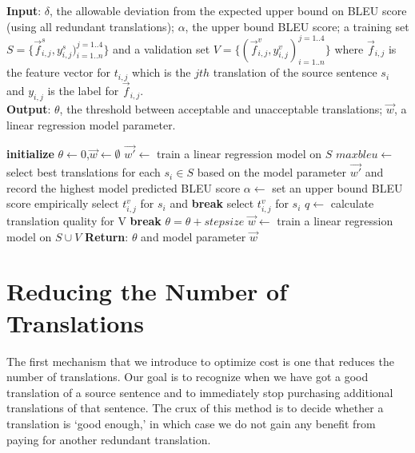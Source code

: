 \documentclass[11pt,letterpaper]{article}
\begin{document}
\begin{algorithm}[h!]
\caption{}\label{modelselection}
\textbf{Input}: $\delta$, the allowable deviation from the expected upper bound on BLEU score (using all redundant translations); $\alpha$, the upper bound BLEU score; a training set $S = \{\vec f^{s}_{i,j},y^{s}_{i,j})_{i=1..n}^{j=1..4}\}$ and a validation set $V = \{(\vec f^{v}_{i,j},y^{v}_{i,j})_{i=1..n}^{j=1..4}\}$ where $\vec f_{i,j}$ is the feature vector for $t_{i,j}$ which is the $jth$ translation of the source sentence $s_{i}$ and $y_{i,j}$ is the label for $\vec f_{i,j}$.\\
\textbf{Output}: $\theta$, the threshold between acceptable and unacceptable translations; $\vec{w}$, a linear regression model parameter. 
\begin{algorithmic}[1]
\State \textbf{initialize} $\theta \leftarrow 0$,$\vec{w}\leftarrow \emptyset$ 
\State $\vec{w'}\leftarrow$ train a linear regression model on $S$
\State $maxbleu \leftarrow$ select best translations for each $s_i \in S$ based on the model parameter $\vec{w'}$ and record the highest model predicted BLEU score
\State $\alpha \leftarrow$ set an upper bound BLEU score empirically
             select $t^{v}_{i,j}$ for $s_i$ and \textbf{break}
\EndIf
{} select $t^{v}_{i,j}$ for $s_i$
\EndIf
\EndFor
\EndFor
\State $q \leftarrow$ calculate translation quality for V
 \textbf{break}
\Else \text{  } $\theta = \theta + stepsize$
\EndIf
\EndWhile
\State $\vec {w} \leftarrow$ train a linear regression model on $S \cup V$
\State \textbf{Return}: $\theta$ and model parameter $\vec{w}$
\end{algorithmic}
\end{algorithm}



\section{Reducing the Number of Translations}
The first mechanism that we introduce to optimize cost is one that reduces the number of translations.  Our goal is to recognize when we have got a good translation of a source sentence and to immediately stop purchasing additional  translations of that sentence.  The crux of this method is to decide whether a translation  is `good enough,' in which case we do not gain any benefit from  paying for another redundant translation.  
\end{document}
